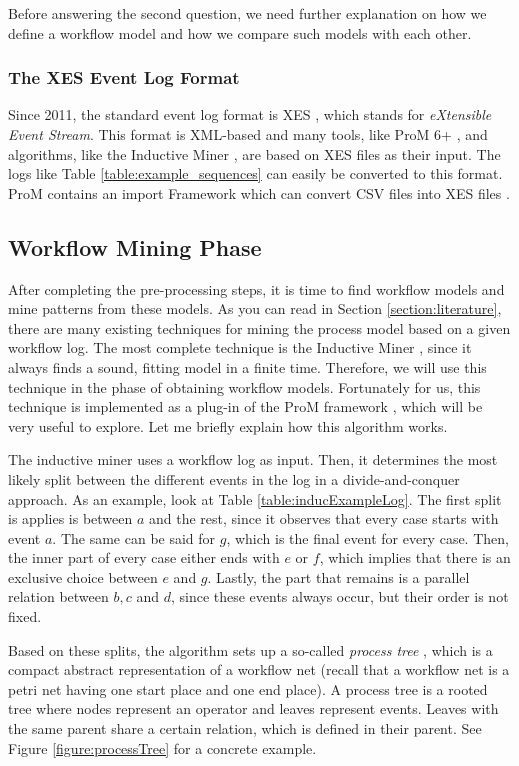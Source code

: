 \documentclass[a4paper,11pt]{article}
\begin{document}
Before answering the second question, we need further explanation on how we define a workflow model and how we compare such models with each other. 

\subsubsection{The XES Event Log Format}
Since 2011, the standard event log format is XES \cite{XES2010Buijs}, which stands for \textit{eXtensible Event Stream}. This format is XML-based and many tools, like ProM 6+ \cite{XES2011Verbeek}, and algorithms, like the Inductive Miner \cite{InductiveMiner2013}, are based on XES files as their input. The logs like Table \ref{table:example_sequences} can easily be converted to this format. ProM contains an import Framework which can convert CSV files into XES files \cite{XES2011Verbeek}. 

\subsection{Workflow Mining Phase}
After completing the pre-processing steps, it is time to find workflow models and mine patterns from these models. As you can read in Section \ref{section:literature}, there are many existing techniques for mining the process model based on a given workflow log. The most complete technique is the Inductive Miner \cite{InductiveMiner2013}, since it always finds a sound, fitting model in a finite time. Therefore, we will use this technique in the phase of obtaining workflow models. Fortunately for us, this technique is implemented as a plug-in of the ProM framework \cite{InductiveVisualMiner2014}, which will be very useful to explore. Let me briefly explain how this algorithm works. 

The inductive miner uses a workflow log as input. Then, it determines the most likely split between the different events in the log in a divide-and-conquer approach. As an example, look at Table \ref{table:inducExampleLog}. The first split is applies is between $a$ and the rest, since it observes that every case starts with event $a$. The same can be said for $g$, which is the final event for every case. Then, the inner part of every case either ends with $e$ or $f$, which implies that there is an exclusive choice between $e$ and $g$. Lastly, the part that remains is a parallel relation between $b,c$ and $d$, since these events always occur, but their order is not fixed.

Based on these splits, the algorithm sets up a so-called \textit{process tree} \cite{Buijs2012ProcessTrees}, which is a compact abstract representation of a workflow net (recall that a workflow net is a petri net having one start place and one end place). A process tree is a rooted tree where nodes represent an operator and leaves represent events. Leaves with the same parent share a certain relation, which is defined in their parent. See Figure \ref{figure:processTree} for a concrete example.
\end{document}
